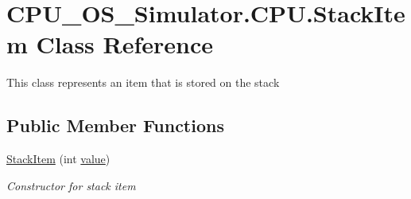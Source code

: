 \hypertarget{class_c_p_u___o_s___simulator_1_1_c_p_u_1_1_stack_item}{}\section{C\+P\+U\+\_\+\+O\+S\+\_\+\+Simulator.\+C\+P\+U.\+Stack\+Item Class Reference}
\label{class_c_p_u___o_s___simulator_1_1_c_p_u_1_1_stack_item}


This class represents an item that is stored on the stack  


\subsection*{Public Member Functions}
\begin{DoxyCompactItemize}
\item 
\hyperlink{class_c_p_u___o_s___simulator_1_1_c_p_u_1_1_stack_item_a7925b78a92c2561df2396e93b858147d}{Stack\+Item} (int \hyperlink{class_c_p_u___o_s___simulator_1_1_c_p_u_1_1_stack_item_a114a8ae5aae9b8c45e2e0c36ce856cd2}{value})
\begin{DoxyCompactList}\small\item\em Constructor for stack item \end{DoxyCompactList}\end{DoxyCompactItemize}
